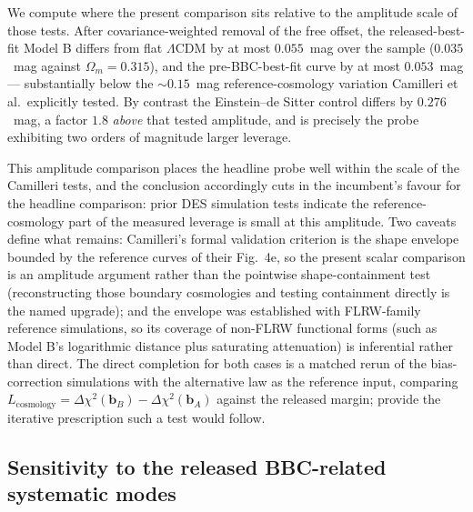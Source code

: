 \documentclass[11pt]{article}
\begin{document}
We compute where the present comparison sits relative to the amplitude
scale of those tests. After covariance-weighted removal of the free
offset, the released-best-fit Model B differs from flat $\Lambda$CDM by
at most $0.055$~mag over the sample ($0.035$~mag against
$\Omega_m = 0.315$), and the pre-BBC-best-fit curve by at most
$0.053$~mag --- substantially below the $\sim 0.15$~mag
reference-cosmology variation Camilleri et al.\ explicitly tested. By
contrast the Einstein--de Sitter control differs by $0.276$~mag, a factor
$1.8$ \emph{above} that tested amplitude, and is precisely the probe
exhibiting two orders of magnitude larger leverage.

This amplitude comparison places the headline probe well within the scale
of the Camilleri tests, and the conclusion accordingly cuts in the
incumbent's favour for the headline comparison: prior DES simulation
tests indicate the reference-cosmology part of the measured leverage is
small at this amplitude. Two caveats define what remains: Camilleri's
formal validation criterion is the shape envelope bounded by the
reference curves of their Fig.~4e, so the present scalar comparison is an
amplitude argument rather than the pointwise shape-containment test
(reconstructing those boundary cosmologies and testing containment
directly is the named upgrade); and the envelope was established with
FLRW-family reference simulations, so its coverage of non-FLRW functional
forms (such as Model B's logarithmic distance plus saturating
attenuation) is inferential rather than direct. The direct completion for both cases is a matched
rerun of the bias-correction simulations with the alternative law as the
reference input, comparing
$L_{\mathrm{cosmology}} =
\Delta\chi^2(\boldsymbol{b}_B) - \Delta\chi^2(\boldsymbol{b}_A)$
against the released margin; \citet{Camilleri2024} provide the iterative
prescription such a test would follow.

\subsection{Sensitivity to the released BBC-related systematic modes}
\label{sec:syssub}
\end{document}
